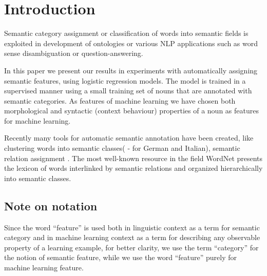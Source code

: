 \documentclass[letterpaper]{article}
\begin{document}
%

\title{}
\maketitle
\begin{abstract}
\begin{quote}
\end{quote}
\end{abstract}


\section{Introduction}

Semantic category assignment or classification of words into semantic fields
is exploited in development of ontologies or various NLP applications such as
word sense disambiguation or question-answering.

In this paper we present our results in experiments with automatically assigning semantic features,
using logistic regression models. The model is trained in a supervised manner
using a small training set of nouns that are annotated with semantic categories.
As features of machine learning 
we have chosen both morphological and syntactic (context behaviour) properties 
of a noun as features for machine learning.

Recently many tools for automatic semantic annotation have been created, like
clustering  words into semantic classes(\cite{baroni:2009} - for German and Italian), 
semantic relation assignment \cite{peirsman}. The most well-known resource
in the field WordNet \cite{wordnet} presents the lexicon of words
interlinked by semantic relations and organized hierarchically into 
semantic classes. 

\subsection{Note on notation}
Since the word ``feature'' is used both in linguistic context as a term for semantic category and in 
machine learning context as a term for describing any observable property of a learning example, for 
better clarity, we use the term ``category'' for the notion of semantic feature, 
while we use the word ``feature'' purely for machine learning feature.
\end{document}
